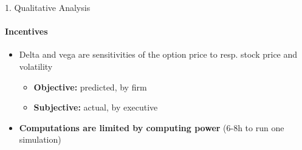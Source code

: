 \documentclass[compress]{beamer}
\begin{document}
\begin{frame}{1. Qualitative Analysis}
    \framesubtitle{Incentives}

    \begin{itemize}
        \item Delta and vega are sensitivities of the option price to resp. stock price and volatility 
        \begin{itemize}
            \item \textbf{Objective:} predicted, by firm
            \item \textbf{Subjective:} actual, by executive 
        \end{itemize}
        \item \textbf{Computations are limited by computing power} (6-8h to run one simulation)
    \end{itemize}
\end{frame}
\end{document}
